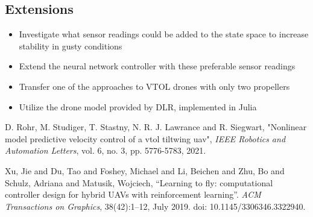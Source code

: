 \documentclass[conference, onecolumn]{IEEEtran}
\begin{document}
\subsection{Extensions}
\begin{itemize}
  \item Investigate what sensor readings could be added to the state space to increase stability in gusty conditions
  \item Extend the neural network controller with these preferable sensor readings
  \item Transfer one of the approaches to VTOL drones with only two propellers
  \item  Utilize the drone model provided by DLR, implemented in Julia
\end{itemize}

\begin{thebibliography}{00}
D. Rohr, M. Studiger, T. Stastny, N. R. J. Lawrance and R. Siegwart, "Nonlinear model predictive velocity control of a vtol tiltwing uav", \textit{IEEE Robotics and Automation Letters}, vol. 6, no. 3, pp. 5776-5783, 2021.

 Xu, Jie and Du, Tao and Foshey, Michael and Li, Beichen and Zhu, Bo and Schulz, Adriana and Matusik, Wojciech, ``Learning to fly: computational controller design for hybrid UAVs with reinforcement learning''. \textit{ACM Transactions on Graphics}, 38(42):1–12, July 2019. doi: 10.1145/3306346.3322940.

\end{thebibliography}
\vspace{12pt}
\end{document}
